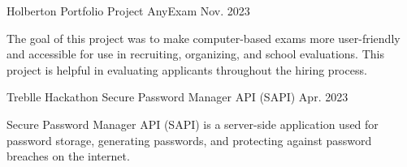 

\begin{cventries}

  \cventry
    {Holberton Portfolio Project} %
    {AnyExam } %
    {} %
    {Nov. 2023} %
    {
      \begin{cvitems} %
        \item {The goal of this project was to make computer-based exams more user-friendly and accessible for use in recruiting, organizing, and school evaluations. This project is helpful in evaluating applicants throughout the hiring process.}
      \end{cvitems}
    }

  \cventry
    {Treblle Hackathon} %
    {Secure Password Manager API (SAPI) } %
    {} %
    {Apr. 2023} %
    {
      \begin{cvitems} %
        \item {Secure Password Manager API (SAPI) is a server-side application used for password storage, generating passwords, and protecting against password breaches on the internet.}
      \end{cvitems}
    }
    
\end{cventries}
